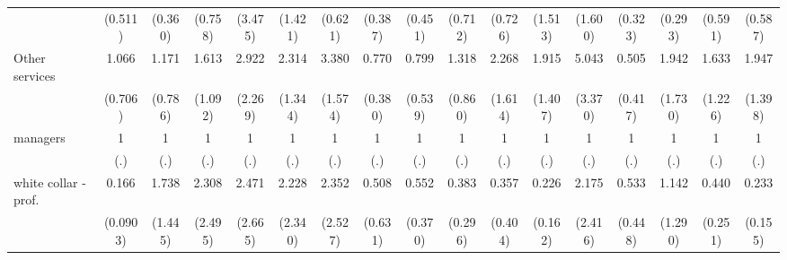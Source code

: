 {\begin{tabular}{l*{16}{c}}
                    &     (0.511)         &     (0.360)         &     (0.758)         &     (3.475)         &     (1.421)         &     (0.621)         &     (0.387)         &     (0.451)         &     (0.712)         &     (0.726)         &     (1.513)         &     (1.600)         &     (0.323)         &     (0.293)         &     (0.591)         &     (0.587)         \\
[1em]
Other services      &       1.066         &       1.171         &       1.613         &       2.922         &       2.314         &       3.380\sym{**} &       0.770         &       0.799         &       1.318         &       2.268         &       1.915         &       5.043\sym{*}  &       0.505         &       1.942         &       1.633         &       1.947         \\
                    &     (0.706)         &     (0.786)         &     (1.092)         &     (2.269)         &     (1.344)         &     (1.574)         &     (0.380)         &     (0.539)         &     (0.860)         &     (1.614)         &     (1.407)         &     (3.370)         &     (0.417)         &     (1.730)         &     (1.226)         &     (1.398)         \\
[1em]
managers            &           1         &           1         &           1         &           1         &           1         &           1         &           1         &           1         &           1         &           1         &           1         &           1         &           1         &           1         &           1         &           1         \\
                    &         (.)         &         (.)         &         (.)         &         (.)         &         (.)         &         (.)         &         (.)         &         (.)         &         (.)         &         (.)         &         (.)         &         (.)         &         (.)         &         (.)         &         (.)         &         (.)         \\
[1em]
white collar - prof.&       0.166\sym{***}&       1.738         &       2.308         &       2.471         &       2.228         &       2.352         &       0.508         &       0.552         &       0.383         &       0.357         &       0.226\sym{*}  &       2.175         &       0.533         &       1.142         &       0.440         &       0.233\sym{*}  \\
                    &    (0.0903)         &     (1.445)         &     (2.495)         &     (2.665)         &     (2.340)         &     (2.527)         &     (0.631)         &     (0.370)         &     (0.296)         &     (0.404)         &     (0.162)         &     (2.416)         &     (0.448)         &     (1.290)         &     (0.251)         &     (0.155)         \\

\end{tabular}}

